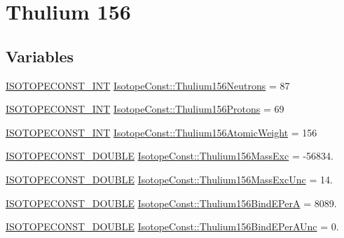 \hypertarget{group___isotope_const-_thulium-_tm156}{}\section{Thulium 156}
\label{group___isotope_const-_thulium-_tm156}
\subsection*{Variables}
\begin{DoxyCompactItemize}
\item 
\mbox{\hyperlink{group___isotope_const-_macros_ga5f18360b3e99483a35c32d789e62621c}{I\+S\+O\+T\+O\+P\+E\+C\+O\+N\+S\+T\+\_\+\+I\+NT}} \mbox{\hyperlink{group___isotope_const-_thulium-_tm156_ga9498ea093ab7a2b3ed256755a97f2627}{Isotope\+Const\+::\+Thulium156\+Neutrons}} = 87
\item 
\mbox{\hyperlink{group___isotope_const-_macros_ga5f18360b3e99483a35c32d789e62621c}{I\+S\+O\+T\+O\+P\+E\+C\+O\+N\+S\+T\+\_\+\+I\+NT}} \mbox{\hyperlink{group___isotope_const-_thulium-_tm156_gadd54835a26bbfc34f439a4481a07b537}{Isotope\+Const\+::\+Thulium156\+Protons}} = 69
\item 
\mbox{\hyperlink{group___isotope_const-_macros_ga5f18360b3e99483a35c32d789e62621c}{I\+S\+O\+T\+O\+P\+E\+C\+O\+N\+S\+T\+\_\+\+I\+NT}} \mbox{\hyperlink{group___isotope_const-_thulium-_tm156_gad277a1224bdedde6f996a6e494384a5d}{Isotope\+Const\+::\+Thulium156\+Atomic\+Weight}} = 156
\item 
\mbox{\hyperlink{group___isotope_const-_macros_ga8f45a7272ce02c0b4c65c44636ed719a}{I\+S\+O\+T\+O\+P\+E\+C\+O\+N\+S\+T\+\_\+\+D\+O\+U\+B\+LE}} \mbox{\hyperlink{group___isotope_const-_thulium-_tm156_ga3874f194a4bbcf9448195773d908b13e}{Isotope\+Const\+::\+Thulium156\+Mass\+Exc}} = -\/56834.
\item 
\mbox{\hyperlink{group___isotope_const-_macros_ga8f45a7272ce02c0b4c65c44636ed719a}{I\+S\+O\+T\+O\+P\+E\+C\+O\+N\+S\+T\+\_\+\+D\+O\+U\+B\+LE}} \mbox{\hyperlink{group___isotope_const-_thulium-_tm156_ga80f8d6c32f98bf14480faea158cc4418}{Isotope\+Const\+::\+Thulium156\+Mass\+Exc\+Unc}} = 14.
\item 
\mbox{\hyperlink{group___isotope_const-_macros_ga8f45a7272ce02c0b4c65c44636ed719a}{I\+S\+O\+T\+O\+P\+E\+C\+O\+N\+S\+T\+\_\+\+D\+O\+U\+B\+LE}} \mbox{\hyperlink{group___isotope_const-_thulium-_tm156_gaebb98bd2d40444289863a63fdc314a51}{Isotope\+Const\+::\+Thulium156\+Bind\+E\+PerA}} = 8089.
\item 
\mbox{\hyperlink{group___isotope_const-_macros_ga8f45a7272ce02c0b4c65c44636ed719a}{I\+S\+O\+T\+O\+P\+E\+C\+O\+N\+S\+T\+\_\+\+D\+O\+U\+B\+LE}} \mbox{\hyperlink{group___isotope_const-_thulium-_tm156_ga99e43807222c2a6bcb9b284035b728b2}{Isotope\+Const\+::\+Thulium156\+Bind\+E\+Per\+A\+Unc}} = 0.

\end{DoxyCompactItemize}

